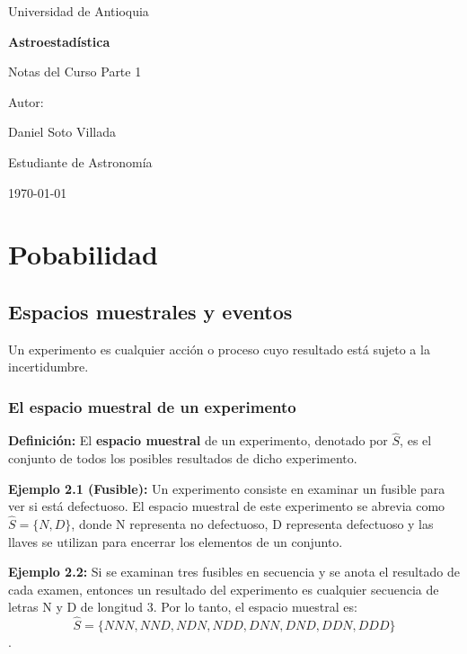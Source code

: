 \documentclass[a4paper]{article}
\begin{document}
\begin{titlepage}
  \centering
  {\Large Universidad de Antioquia\par}
  \vspace{2cm}
  {\huge\bfseries Astroestadística\par}
  \vspace{0.4cm}
  {\Large Notas del Curso Parte 1\par}
  \vspace{2.5cm}
  {\large Autor:\par}
  \vspace{0.2cm}
  {\large Daniel Soto Villada\par}
  {\large Estudiante de Astronomía\par}
  \vfill
  {\large \today\par}
\end{titlepage}

\newpage
\tableofcontents
\newpage

\section{Pobabilidad}

\subsection{Espacios muestrales y eventos}
Un experimento es cualquier acción o proceso cuyo resultado está sujeto a la incertidumbre.

\subsubsection{El espacio muestral de un experimento}

\textbf{Definición:}
El \textbf{espacio muestral} de un experimento, denotado por $\hat{S}$, es el conjunto de todos los posibles resultados de dicho experimento.

\textbf{Ejemplo 2.1 (Fusible):}
Un experimento consiste en examinar un fusible para ver si está defectuoso. El espacio muestral de este experimento se abrevia como $\hat{S} = \{N, D\}$, donde N representa no defectuoso, D representa defectuoso y las llaves se utilizan para encerrar los elementos de un conjunto.

\textbf{Ejemplo 2.2:}
Si se examinan tres fusibles en secuencia y se anota el resultado de cada examen, entonces un resultado del experimento es cualquier secuencia de letras N y D de longitud 3. Por lo tanto, el espacio muestral es:
$$ \hat{S} = \{NNN, NND, NDN, NDD, DNN, DND, DDN, DDD\} $$.
\end{document}
